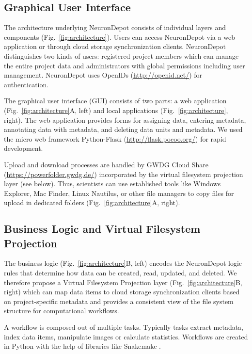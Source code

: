 \documentclass{frontiersSCNS} %
\begin{document}
\subsection{Graphical User Interface}
The architecture underlying NeuronDepot consists of individual layers and
components (Fig.~\ref{fig:architecture}). Users can access NeuronDepot via a
web application or through cloud storage synchronization clients. NeuronDepot
distinguishes two kinds of users: registered project members which can manage
the entire project data and administrators with global permissions including
user management. NeuronDepot uses OpenIDs (\url{http://openid.net/}) for
authentication.

The graphical user interface (GUI) consists of two parts: a web application
(Fig.~\ref{fig:architecture}A, left) and local applications
(Fig.~\ref{fig:architecture}, right). The web application provides forms for
assigning data, entering metadata, annotating data with metadata, and deleting
data units and metadata. We used the micro web framework Python-Flask
(\url{http://flask.pocoo.org/}) for rapid development.

Upload and download processes are handled by GWDG Cloud Share
(\url{https://powerfolder.gwdg.de/}) incorporated by the virtual filesystem
projection layer (see below). Thus, scientists can use established tools like
Windows Explorer, Mac Finder, Linux Nautilus, or other file managers to copy
files for upload in dedicated folders (Fig.~\ref{fig:architecture}A, right).

\subsection{Business Logic and Virtual Filesystem Projection}\label{sec:projection_layer}

The business logic (Fig.~\ref{fig:architecture}B, left) encodes the NeuronDepot
logic rules that determine how data can be created, read, updated, and deleted.
We therefore propose a
Virtual Filesystem Projection layer (Fig.~\ref{fig:architecture}B, right) which
can map data items to cloud storage synchronization clients
based on project-specific metadata and provides a consistent view of the file
system structure for computational workflows.

A workflow is composed out of multiple tasks. Typically tasks extract metadata,
index data items, manipulate images or calculate statistics. Workflows are
created in Python with the help of libraries like Snakemake
\citep{Koester2012}.
\end{document}
